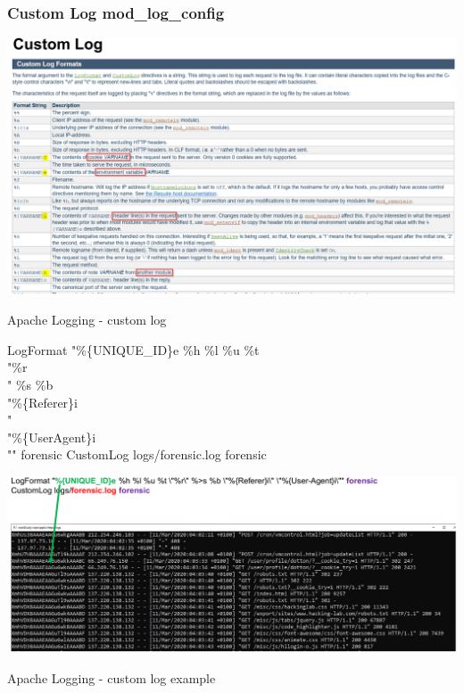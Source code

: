 \subsubsection{Custom Log mod\_log\_config}

\begin{table}[h]
  \centering
  \includegraphics[width=\textwidth]{resources/12-apache-custom-log.png}
  \caption{Apache Logging - custom log}
\end{table}

LogFormat "\%\{UNIQUE\_ID\}e \%h \%l \%u \%t \\"\%r\\" \%\>s \%b \\"\%\{Referer\}i\\" \\"\%\{User\-Agent\}i\\"" forensic CustomLog logs/forensic.log forensic

\begin{table}[h]
  \centering
  \includegraphics[width=\textwidth]{resources/12-apache-custom-log-2.png}
  \caption{Apache Logging - custom log example}
\end{table}

